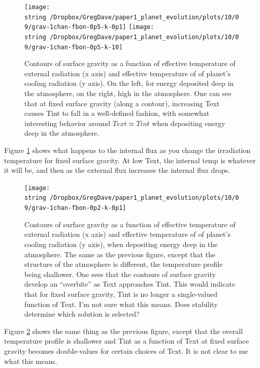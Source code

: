 \documentclass{emulateapj}
\begin{document}
\begin{figure}
\texttt{[image: \\string~/Dropbox/GregDave/paper1\_planet\_evolution/plots/10/09/grav-1chan-fbon-0p5-k-0p1]}
\texttt{[image: \\string~/Dropbox/GregDave/paper1\_planet\_evolution/plots/10/09/grav-1chan-fbon-0p5-k-10]}
\caption{Contours of surface gravity as a function of effective
  temperature of external radiation (x axis) and effective temperature
of of planet's cooling radiation (y axis).  On the left, for energy
deposited deep in the atmosphere, on the right, high in the
atmosphere.   One can see that at fixed surface gravity (along a
contour), increasing Text causes Tint to fall in a well-defined
fashion, with somewhat interesting behavior around $Text \simeq Tint$
when depositing energy deep in the atmosphere.}
\label{fig:surf-grav-vs-text-and-tint}
\end{figure}

Figure \ref{fig:surf-grav-vs-text-and-tint} shows what happens to the
internal flux as you change the irradiation temperature for fixed
surface gravity.  At low Text, the internal temp is whatever it will
be, and then as the external flux increases the internal flux drops.  

\begin{figure}
\texttt{[image: \\string~/Dropbox/GregDave/paper1\_planet\_evolution/plots/10/09/grav-1chan-fbon-0p2-k-0p1]}
\caption{Contours of surface gravity as a function of effective
  temperature of external radiation (x axis) and effective temperature
  of of planet's cooling radiation (y axis), when depositing energy
  deep in the atmosphere.  The same as the previous figure, except
  that the structure of the atmosphere is different, the temperature
  profile being shallower.  One sees that the contours of surface
  gravity develop an ``overbite'' as Text approaches Tint.  This would
  indicate that for fixed surface gravity, Tint is no longer a
  single-valued function of Text.  I'm not sure what this means.  Does
  stability determine which solution is selected?}
\label{fig:surf-grav-vs-text-and-tint-shallow-temp-profile}
\end{figure}

Figure \ref{fig:surf-grav-vs-text-and-tint-shallow-temp-profile} shows
the same thing as the previous figure, except that the overall
temperature profile is shallower and Tint as a function of Text at
fixed surface gravity becomes double-values for certain choices of
Text.  It is not clear to me what this means.  
\end{document}

